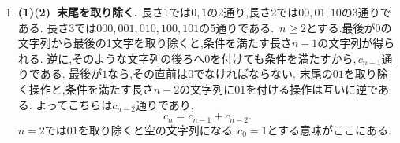 \begin{enumerate}[label=\textbf{問\arabic*.},leftmargin=3.8em,format=\bookitemlink{practice-bridge}{solution}{problem}]
                \smallskip
                \textbf{(2)(3)~定数を引いて等比型へ.}
                チャートの「係数の変化」と「付加項の有無と定数」に対応する,定数項を消す解法である.
                定数の解$\displaystyle \frac12$を引けば,
                \[
                  p_{n+1}-\frac12
                   =-\frac13\left(p_n-\frac12\right).
                \]
                初期値$\displaystyle p_0=1$より,
                \[
                  p_n-\frac12=\frac12\left(-\frac13\right)^n.
                \]
                公比の絶対値が$\displaystyle 1$未満だからは$\displaystyle \frac12$となる.
                「偶数か奇数か」だけを記録すれば,赤の正確な個数をすべて追う必要はない.
          \item \textbf{(1)(2)~末尾を取り除く.}
                長さ1では$\displaystyle 0,1$の2通り,長さ2では$\displaystyle 00,01,10$の3通りである.
                長さ3では\BookMathLayout{}{\newline}$\displaystyle 000,001,010,100,101$の5通りである.\,
                $\displaystyle n\ge2$とする.最後が$\displaystyle 0$の文字列から最後の1文字を取り除くと,条件を満たす長さ$\displaystyle n-1$の文字列が得られる.
                逆に,そのような文字列の後ろへ$\displaystyle 0$を付けても条件を満たすから,\,$\displaystyle c_{n-1}$通りである.
                最後が$\displaystyle 1$なら,その直前は$\displaystyle 0$でなければならない.
                末尾の$\displaystyle 01$を取り除く操作と,条件を満たす長さ$\displaystyle n-2$の文字列に$\displaystyle 01$を付ける操作は互いに逆である.
                よってこちらは$\displaystyle c_{n-2}$通りであり,
                \[
                  c_n=c_{n-1}+c_{n-2}.
                \]
                $\displaystyle n=2$では$\displaystyle 01$を取り除くと空の文字列になる.\,$\displaystyle c_0=1$とする意味がここにある.


\end{enumerate}
